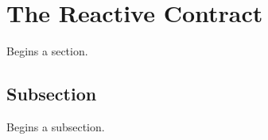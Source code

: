 \section{The Reactive Contract}
\label{sec:sec01}

Begins a section.

\subsection{Subsection}
\label{subsec:subsec01}

Begins a subsection.

\listoftodos


